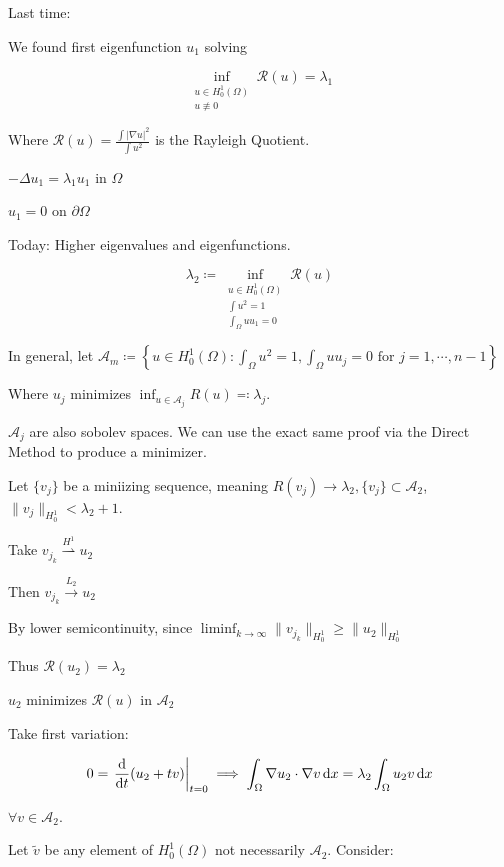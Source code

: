\documentclass{article}
\theoremstyle{definition}
\begin{document}
Last time:

We found first eigenfunction \(u_1\) solving

\[
    \inf_{\substack{u \in H^1_0(\Omega) \\ u \not\equiv 0}} \mathcal{R}(u) = \lambda_1
\]

Where \(\mathcal{R}(u) = \frac{\int \vert \nabla u \vert ^2}{\int u ^ 2}\) is the Rayleigh Quotient.

\(- \Delta u_1 = \lambda_1 u_1\) in \(\Omega\) 

\(u_1 = 0\) on \(\partial \Omega\) 

Today: Higher eigenvalues and eigenfunctions.

\[
    \lambda_2 \coloneqq \inf_{\substack{u \in H^1_0(\Omega) \\ \int u^2 = 1 \\ \int_\Omega u u_1 = 0}} \mathcal{R}(u)
\]

In general, let \(\mathscr{A}_m \coloneqq \left\{ u \in H^1_0(\Omega) : \int_\Omega u^2 = 1, \int_\Omega u u_j = 0 \text{ for } j = 1, \cdots , n-1 \right\}\)

Where \(u_j\) minimizes \(\inf_{u \in \mathscr{A}_j} R(u) \eqqcolon \lambda_j\).

\(\mathscr{A}_j\) are also sobolev spaces. We can use the exact same proof via the Direct Method to produce a minimizer.

Let \(\{ v_j \}\) be a miniizing sequence, meaning \(R(v_j) \to \lambda_2, \{ v_j \} \subset \mathscr{A}_2\), \(\lVert v_j \rVert _{H^1_0} < \lambda_2  + 1\).

Take \(v_{j_k} \overset{H^1}{\rightharpoonup} u_2\)

Then \(v_{j_k} \overset{L_2}{\to} u_2 \)

By lower semicontinuity, since \(\liminf_{k \to \infty} \lVert v_{j_k} \rVert _{H^1_0} \geq \lVert u_2 \rVert _{H^1_0}\) 

Thus \(\mathcal{R}(u_2) = \lambda_2\) 

\(u_2\) minimizes \(\mathcal{R}(u)\) in \(\mathscr{A}_2\) 

Take first variation:

\[
    0 = \eval{\frac{\mathrm{d}}{\mathrm{d}t} (u_2 + tv)}_{t=0} \implies \int_\Omega \nabla u_2 \cdot \nabla v \, \mathrm{d}x = \lambda_2 \int_{\Omega} u_2 v \,\mathrm{d}x 
\]

\(\forall v\in \mathscr{A}_2\).

Let \(\widetilde{v}\) be any element of \(H^1_0(\Omega)\) not necessarily \(\mathscr{A}_2\). Consider:
\end{document}
